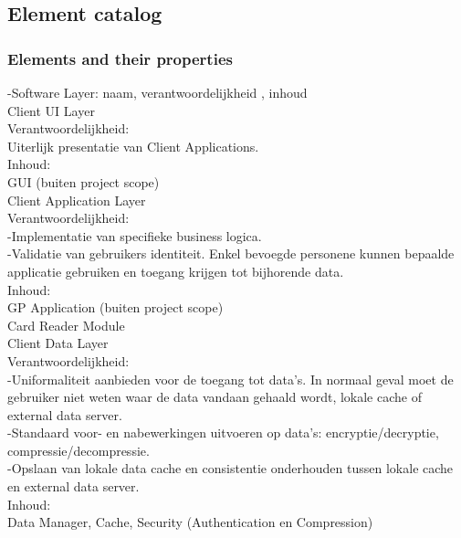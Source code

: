 \documentclass[a4paper,10pt]{article}
\begin{document}
\subsection{Element catalog}

\subsubsection{Elements and their properties}

-Software Layer: naam, verantwoordelijkheid , inhoud\\

Client UI Layer\\

Verantwoordelijkheid:\\
Uiterlijk presentatie van Client Applications.\\

Inhoud:\\
GUI (buiten project scope)\\

Client Application Layer\\

Verantwoordelijkheid:\\
-Implementatie van specifieke business logica.\\
-Validatie van gebruikers identiteit. Enkel bevoegde personene kunnen bepaalde applicatie gebruiken en toegang krijgen tot bijhorende data.\\

Inhoud:\\
GP Application (buiten project scope)\\
Card Reader Module\\

Client Data Layer\\

Verantwoordelijkheid:\\
-Uniformaliteit aanbieden voor de toegang tot data's. In normaal geval moet de gebruiker niet weten waar de data vandaan gehaald wordt, lokale cache of external data server.\\
-Standaard voor- en nabewerkingen uitvoeren op data's: encryptie/decryptie, compressie/decompressie.\\
-Opslaan van lokale data cache en consistentie onderhouden tussen lokale cache en external data server.\\

Inhoud:\\
Data Manager, Cache, Security (Authentication en Compression)\\
\end{document}
